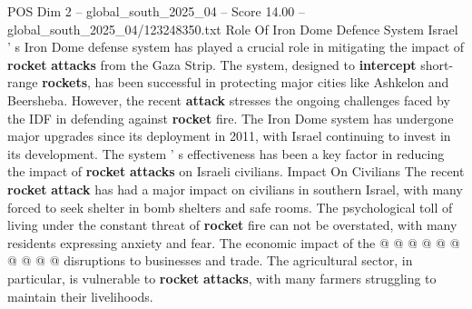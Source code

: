 \begin{textsample}{POS Dim 2 – global\_south\_2025\_04 – Score 14.00 – global\_south\_2025\_04/123248350.txt}
Role Of Iron Dome Defence System Israel ' s Iron Dome defense system has played a crucial role in mitigating the impact of \textbf{rocket} \textbf{attacks} from the Gaza Strip.
The system, designed to \textbf{intercept} short-range \textbf{rockets}, has been successful in protecting major cities like Ashkelon and Beersheba.
However, the recent \textbf{attack} stresses the ongoing challenges faced by the IDF in defending against \textbf{rocket} fire.
The Iron Dome system has undergone major upgrades since its deployment in 2011, with Israel continuing to invest in its development.
The system ' s effectiveness has been a key factor in reducing the impact of \textbf{rocket} \textbf{attacks} on Israeli civilians.
Impact On Civilians The recent \textbf{rocket} \textbf{attack} has had a major impact on civilians in southern Israel, with many forced to seek shelter in bomb shelters and safe rooms.
The psychological toll of living under the constant threat of \textbf{rocket} fire can not be overstated, with many residents expressing anxiety and fear.
The economic impact of the @ @ @ @ @ @ @ @ @ @ disruptions to businesses and trade.
The agricultural sector, in particular, is vulnerable to \textbf{rocket} \textbf{attacks}, with many farmers struggling to maintain their livelihoods.

\end{textsample}
